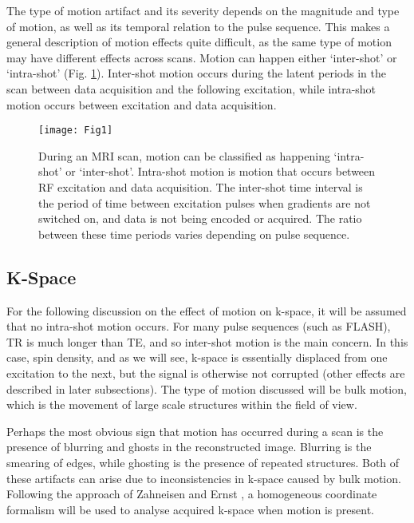 \documentclass[class=article, crop=false]{standalone}
\begin{document}
The type of motion artifact and its severity depends on the magnitude and type of motion, as well as its temporal relation to the pulse sequence. This makes a general description of motion effects quite difficult, as the same type of motion may have different effects across scans. Motion can happen either `inter-shot' or `intra-shot' (Fig. \ref{fig:fig1}). Inter-shot motion occurs during the latent periods in the scan between data acquisition and the following excitation, while intra-shot motion occurs between excitation and data acquisition. 

\begin{figure}[h]
	\texttt{[image: Fig1]}
	\centering
	\caption{During an MRI scan, motion can be classified as happening `intra-shot' or `inter-shot'. Intra-shot motion is motion that occurs between RF excitation and data acquisition. The inter-shot time interval is the period of time between excitation pulses when gradients are not switched on, and data is not being encoded or acquired. The ratio between these time periods varies depending on pulse sequence.}
	\label{fig:fig1}
\end{figure}

\subsection{K-Space}

For the following discussion on the effect of motion on k-space, it will be assumed that no intra-shot motion occurs. For many pulse sequences (such as FLASH), TR is much longer than TE, and so inter-shot motion is the main concern. In this case, spin density, and as we will see, k-space is essentially displaced from one excitation to the next, but the signal is otherwise not corrupted (other effects are described in later subsections). The type of motion discussed will be bulk motion, which is the movement of large scale structures within the field of view.
\par
Perhaps the most obvious sign that motion has occurred during a scan is the presence of blurring and ghosts in the reconstructed image. Blurring is the smearing of edges, while ghosting is the presence of repeated structures. Both of these artifacts can arise due to inconsistencies in k-space caused by bulk motion. Following the approach of Zahneisen and Ernst \parencite*{Zahneisen2016}, a homogeneous coordinate formalism will be used to analyse acquired k-space when motion is present.
\end{document}
